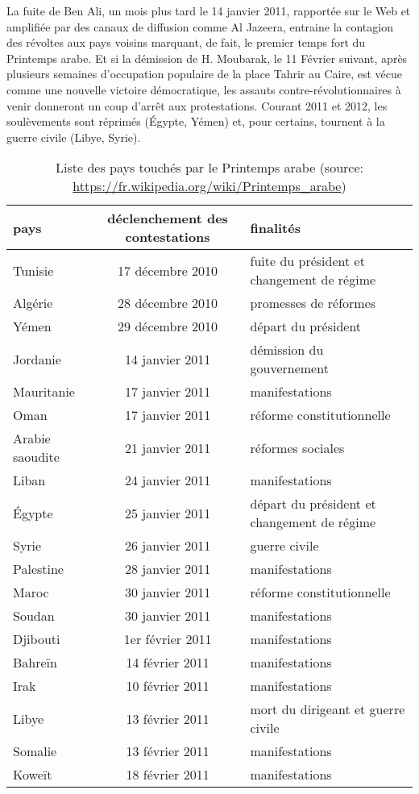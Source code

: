\documentclass[symmetric,justified,marginals=raggedouter]{tufte-book}
\begin{document}
La fuite de Ben Ali, un mois plus tard le 14 janvier 2011, rapportée sur le Web et amplifiée par des canaux de diffusion comme Al Jazeera, entraine la contagion des révoltes aux pays voisins marquant, de fait, le premier temps fort du Printemps arabe. Et si la démission de H. Moubarak, le 11 Février suivant, après plusieurs semaines d'occupation populaire de la place Tahrir au Caire, est vécue comme une nouvelle victoire démocratique, les assauts contre-révolutionnaires à venir donneront un coup d'arrêt aux protestations. Courant 2011 et 2012, les soulèvements sont réprimés (Égypte, Yémen) et, pour certains, tournent à la guerre civile (Libye, Syrie). \\

\begin{table*}
  \label{tab:printemps}
  \begin{tabular}{lcl}
    \toprule
    pays&déclenchement des contestations&finalités\\
    \midrule
Tunisie&17 décembre 2010&fuite du président et changement de régime\\
Algérie&28 décembre 2010&promesses de réformes\\
Yémen&29 décembre 2010&départ du président\\
Jordanie&14 janvier 2011&démission du gouvernement\\
Mauritanie&17 janvier 2011&manifestations\\
Oman&17 janvier 2011&réforme constitutionnelle\\
Arabie saoudite&21 janvier 2011&réformes sociales\\
Liban&24 janvier 2011&manifestations\\
Égypte&25 janvier 2011&départ du président et changement de régime\\
Syrie&26 janvier 2011&guerre civile\\
Palestine&28 janvier 2011&manifestations\\
Maroc&30 janvier 2011&réforme constitutionnelle\\
Soudan&30 janvier 2011&manifestations\\
Djibouti&1er février 2011&manifestations\\
Bahreïn&14 février 2011&manifestations\\
Irak&10 février 2011&manifestations\\
Libye&13 février 2011&mort du dirigeant et guerre civile\\
Somalie&13 février 2011&manifestations\\
Koweït&18 février 2011&manifestations\\
  \bottomrule
  \end{tabular}
  \bigskip
  \caption{Liste des pays touchés par le Printemps arabe (source: \url{https://fr.wikipedia.org/wiki/Printemps_arabe})}
\end{table*}
\end{document}
